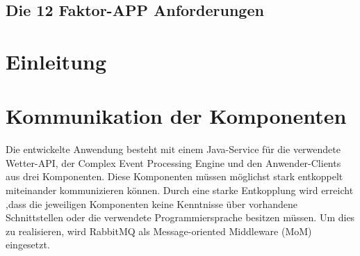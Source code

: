 \documentclass[paper,oneside,onecolumn,notitlepage,bibtotocnumbered,fontsize=12pt,bigheadings,ngerman]{scrartcl}
\begin{document}
\clearpage



\subsection{Die 12 Faktor-APP Anforderungen}

\section{Einleitung}

\section{Kommunikation der Komponenten}
Die entwickelte Anwendung besteht mit einem Java-Service für die verwendete Wetter-API, der Complex Event Processing Engine und den Anwender-Clients aus drei Komponenten. Diese Komponenten müssen möglichst stark entkoppelt miteinander kommunizieren können. Durch eine starke Entkopplung wird erreicht ,dass die jeweiligen Komponenten keine Kenntnisse über vorhandene Schnittstellen oder die verwendete Programmiersprache besitzen müssen. Um dies zu realisieren, wird RabbitMQ als Message-oriented Middleware (MoM) eingesetzt. 
\end{document}
